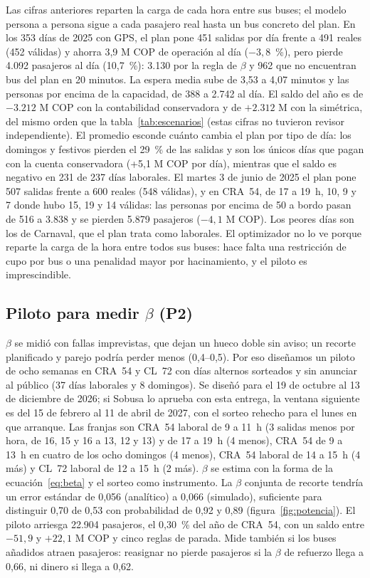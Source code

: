 Las cifras anteriores reparten la carga de cada hora entre sus buses; el modelo persona a persona sigue a cada pasajero
real hasta un bus concreto del plan. En los 353 días de 2025 con GPS, el plan pone 451 salidas por día frente a 491
reales (452 válidas) y ahorra 3,9 M COP de operación al día ($-3{,}8$~\%), pero pierde 4.092 pasajeros al día
(10,7~\%): 3.130 por la regla de $\beta$ y 962 que no encuentran bus del plan en 20 minutos. La espera media sube de
3,53 a 4,07 minutos y las personas por encima de la capacidad, de 388 a 2.742 al día. El saldo del año es de $-3.212$ M
COP con la contabilidad conservadora y de $+2.312$ M con la simétrica, del mismo orden que la tabla~\ref{tab:escenarios}
(estas cifras no tuvieron revisor independiente). El promedio esconde cuánto cambia el plan por tipo de día: los
domingos y festivos pierden el 29~\% de las salidas y son los únicos días que pagan con la cuenta conservadora (+5,1 M
COP por día), mientras que el saldo es negativo en 231 de 237 días laborales. El martes 3 de junio de 2025 el plan pone
507 salidas frente a 600 reales (548 válidas), y en CRA~54, de 17 a 19~h, 10, 9 y 7 donde hubo 15, 19 y 14 válidas: las
personas por encima de 50 a bordo pasan de 516 a 3.838 y se pierden 5.879 pasajeros ($-4{,}1$ M COP). Los peores días
son los de Carnaval, que el plan trata como laborales. El optimizador no lo ve porque reparte la carga de la hora entre
todos sus buses: hace falta una restricción de cupo por bus o una penalidad mayor por hacinamiento, y el piloto es
imprescindible.

\subsection{Piloto para medir \texorpdfstring{$\beta$}{beta} (P2)}
\label{sec:res-piloto}

$\beta$ se midió con fallas imprevistas, que dejan un hueco doble sin aviso; un recorte planificado y parejo podría
perder menos (0,4--0,5). Por eso diseñamos un piloto de ocho semanas en CRA~54 y CL~72 con días alternos sorteados y sin
anunciar al público (37 días laborales y 8 domingos). Se diseñó para el 19 de octubre al 13 de diciembre de 2026; si
Sobusa lo aprueba con esta entrega, la ventana siguiente es del 15 de febrero al 11 de abril de 2027, con el sorteo
rehecho para el lunes en que arranque. Las franjas son
CRA~54 laboral de 9 a 11~h (3 salidas menos por hora, de 16, 15 y 16 a 13, 12 y 13) y de 17 a 19~h (4 menos), CRA~54 de
9 a 13~h en cuatro de los ocho domingos (4 menos), CRA~54 laboral de 14 a 15~h (4 más) y CL~72 laboral de 12 a 15~h
(2 más). $\beta$ se estima con la forma de la ecuación~\eqref{eq:beta} y el sorteo como instrumento. La $\beta$ conjunta de
recorte tendría un error estándar de 0,056 (analítico) a 0,066 (simulado), suficiente para distinguir 0,70 de 0,53 con
probabilidad de 0,92 y 0,89 (figura~\ref{fig:potencia}). El piloto arriesga 22.904 pasajeros, el 0,30~\% del año de
CRA~54, con un saldo entre $-51{,}9$ y $+22{,}1$ M COP y cinco reglas de parada. Mide también si los buses añadidos
atraen pasajeros: reasignar no pierde pasajeros si la $\beta$ de refuerzo llega a 0,66, ni dinero si llega a 0,62.


